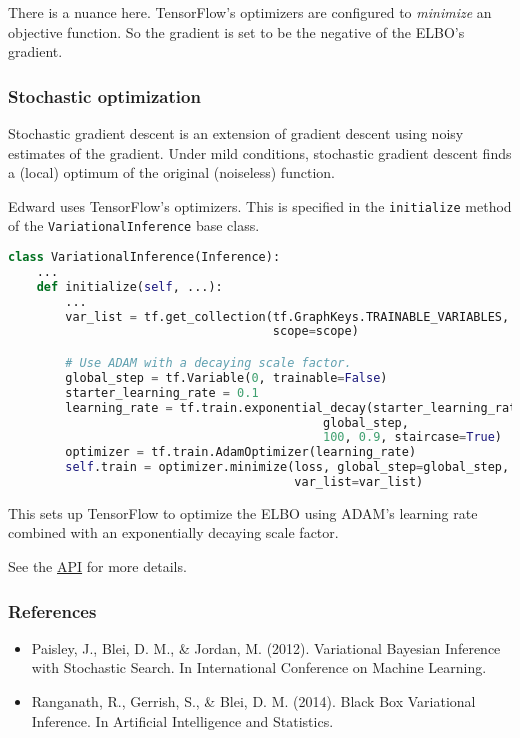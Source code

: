 There is a nuance here. TensorFlow's optimizers are configured to
\emph{minimize} an objective function. So the gradient is set to be
the negative of the ELBO's gradient.

\subsubsection{Stochastic optimization}

Stochastic gradient descent is an extension of gradient descent using
noisy estimates of the gradient. Under mild conditions, stochastic
gradient descent finds a (local) optimum of the original (noiseless)
function.

Edward uses TensorFlow's optimizers.
This is specified in the \texttt{initialize} method of the
\texttt{VariationalInference} base class.

\begin{lstlisting}[language=Python]
class VariationalInference(Inference):
    ...
    def initialize(self, ...):
        ...
        var_list = tf.get_collection(tf.GraphKeys.TRAINABLE_VARIABLES,
                                     scope=scope)

        # Use ADAM with a decaying scale factor.
        global_step = tf.Variable(0, trainable=False)
        starter_learning_rate = 0.1
        learning_rate = tf.train.exponential_decay(starter_learning_rate,
                                            global_step,
                                            100, 0.9, staircase=True)
        optimizer = tf.train.AdamOptimizer(learning_rate)
        self.train = optimizer.minimize(loss, global_step=global_step,
                                        var_list=var_list)
\end{lstlisting}

This sets up TensorFlow to optimize the ELBO using ADAM's learning
rate combined with an exponentially decaying scale factor.

See the \href{api/index.html}{API} for more details.

\subsubsection{References}\label{references}

\begin{itemize}
\item
  Paisley, J., Blei, D. M., & Jordan, M. (2012). Variational Bayesian
  Inference with Stochastic Search. In International Conference on
  Machine Learning.
\item
  Ranganath, R., Gerrish, S., & Blei, D. M. (2014). Black Box
  Variational Inference. In Artificial Intelligence and Statistics.
\end{itemize}
